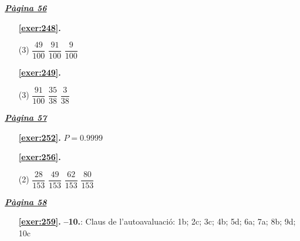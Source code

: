 
\hyperlink{page.56}{\textbf{\em Pàgina 56}}
\begin{enumerate}



 \item[\fontfamily{phv}\selectfont\color{blue}\textbf{\ref{exer:248}. }] \label{ans:248}
 \begin{tasks}[column-sep=1em, item-indent=1.3333em](3)
	 \task $\dfrac {49}{100}$
	 \task $\dfrac {91}{100}$
	 \task $\dfrac {9}{100}$
\end{tasks}
 \end{enumerate}
\begin{enumerate}



 \item[\fontfamily{phv}\selectfont\color{blue}\textbf{\ref{exer:249}. }] \label{ans:249}
 \begin{tasks}[column-sep=1em, item-indent=1.3333em](3)
	 \task $\dfrac {91}{100}$
	 \task $\dfrac {35}{38}$
	 \task $\dfrac {3}{38}$
\end{tasks}
 \end{enumerate}
\vspace{0.3cm}


\hyperlink{page.57}{\textbf{\em Pàgina 57}}
\begin{enumerate}
\item[\fontfamily{phv}\selectfont\color{blue}\textbf{\ref{exer:252}. }] \label{ans:252} 
$P=0.9999$
 \end{enumerate}
\begin{enumerate}



 \item[\fontfamily{phv}\selectfont\color{blue}\textbf{\ref{exer:256}. }] \label{ans:256}
 \begin{tasks}[column-sep=1em, item-indent=1.3333em](2)
	 \task $\dfrac {28}{153}$
	 \task $\dfrac {49}{153}$
	 \task $\dfrac {62}{153}$
	 \task $\dfrac {80}{153}$
\end{tasks}
 \end{enumerate}
\vspace{0.3cm}


\hyperlink{page.58}{\textbf{\em Pàgina 58}}
\begin{enumerate}
\item[\fontfamily{phv}\selectfont\color{blue}\textbf{\ref{exer:259}. }] \label{ans:259} 
\textbf {--10.}: Claus de l'autoavaluació: 1b; 2c; 3c; 4b; 5d; 6a; 7a; 8b; 9d; 10c
 \end{enumerate}

